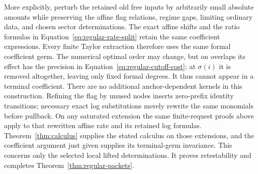 More explicitly, perturb the retained old free inputs by arbitrarily
small absolute amounts while preserving the affine flag relations,
regime gaps, limiting ordinary data, and chosen sector determinations.
The exact affine shifts and the ratio formulas in
Equation~\eqref{eq:regular-rate-split} retain the same coefficient
expressions.  Every finite Taylor extraction therefore uses the same
formal coefficient germ.  The numerical optimal order may change,
but on overlaps its effect has the precision in
Equation~\eqref{eq:regular-cutoff-cost}; at $\sigma(i)$ it is removed
altogether, leaving only fixed formal degrees.  It thus cannot appear
in a terminal coefficient.  There are no additional anchor-dependent
kernels in this construction.  Refining the flag by unused nodes
inserts zero-prefix identity transitions; necessary exact log
substitutions merely rewrite the same monomials before pullback.
On any saturated extension the same finite-request proofs above
apply to that rewritten affine rate and its retained log formulas.
Theorem~\ref{thm:calculus} supplies the stated calculus on those
extensions, and the coefficient argument just given supplies its
terminal-germ invariance.  This concerns only the selected local
lifted determinations.  It proves retestability and completes
Theorem~\ref{thm:regular-packets}.
